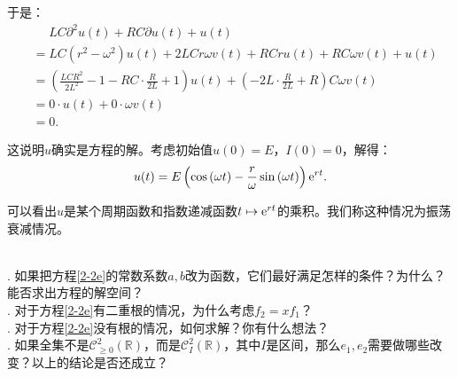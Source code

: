 \documentclass[12pt,UTF8,fontset=none]{ctexbook}
\begin{document}
\begin{so}
    于是：
    \begin{align*}
        &\quad\,\, LC\partial^2 u(t) + RC\partial u(t) + u(t) \\
        &= LC(r^2 - \omega^2)u(t) + 2LCr\omega v(t) + RCru(t) + RC\omega v(t) +u(t) \\
        &= \left(\frac{LCR^2}{2L^2} - 1 - RC\cdot \frac{R}{2L} + 1\right)u(t) + \left(- 2L\cdot \frac{R}{2L} + R\right)C\omega v(t) \\
        &= 0 \cdot u(t) + 0\cdot \omega v(t) \\
        &= 0.
    \end{align*}

    这说明$u$确实是方程的解。考虑初始值$u(0) = E$，$I(0) = 0$，解得：
    $$ u(t) =  E\left(\cos{(\omega t)} - \frac{r}{\omega}\sin{(\omega t)}\right)\mathrm{e}^{rt}. $$

    可以看出$u$是某个周期函数和指数递减函数$t\mapsto \mathrm{e}^{rt}$的乘积。我们称这种情况为振荡衰减情况。

\end{so}

\begin{sk}
    \mbox{} \\
    . 如果把方程\eqref{2-2e}的常数系数$a,b$改为函数，它们最好满足怎样的条件？为什么？
    能否求出方程的解空间？\\
    . 对于方程\eqref{2-2e}有二重根的情况，为什么考虑$f_2 = xf_1$？\\
    . 对于方程\eqref{2-2e}没有根的情况，如何求解？你有什么想法？\\
    . 如果全集不是$\mathcal{C}^2_{\geqslant 0}(\mathbb{R})$，而是$\mathcal{C}^2_I(\mathbb{R})$，其中$I$是区间，那么$e_1, e_2$需要做哪些改变？以上的结论是否还成立？
    
\end{sk}
\end{document}
